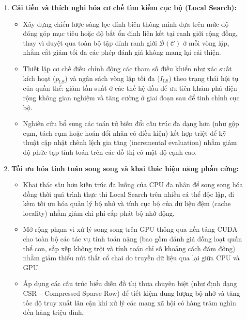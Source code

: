 \documentclass[14pt,a4paper]{extarticle}
\begin{document}
\begin{enumerate}
    \item \textbf{Cải tiến và thích nghi hóa cơ chế tìm kiếm cục bộ (Local Search):}
    \begin{itemize}
        \item Xây dựng chiến lược sàng lọc đỉnh biên thông minh dựa trên mức độ đóng góp mục tiêu hoặc độ bất ổn định liên kết tại ranh giới cộng đồng, thay vì duyệt qua toàn bộ tập đỉnh ranh giới $\mathcal{B}(\mathcal{C})$ ở mỗi vòng lặp, nhằm cắt giảm tối đa các phép đánh giá không mang lại cải thiện.
        \item Thiết lập cơ chế điều chỉnh động các tham số điều khiển như xác suất kích hoạt ($p_{\text{LS}}$) và ngân sách vòng lặp tối đa ($I_{\text{LS}}$) theo trạng thái hội tụ của quần thể: giảm tần suất ở các thế hệ đầu để ưu tiên khám phá diện rộng không gian nghiệm và tăng cường ở giai đoạn sau để tinh chỉnh cục bộ.
        \item Nghiên cứu bổ sung các toán tử biến đổi cấu trúc đa dạng hơn (như gộp cụm, tách cụm hoặc hoán đổi nhãn có điều kiện) kết hợp triệt để kỹ thuật cập nhật chênh lệch gia tăng (incremental evaluation) nhằm giảm độ phức tạp tính toán trên các đồ thị có mật độ cạnh cao.
    \end{itemize}

    \item \textbf{Tối ưu hóa tính toán song song và khai thác hiệu năng phần cứng:}
    \begin{itemize}
        \item Khai thác sâu hơn kiến trúc đa luồng của $\text{CPU}$ đa nhân để song song hóa đồng thời quá trình thực thi Local Search trên nhiều cá thể độc lập, đi kèm tối ưu hóa quản lý bộ nhớ và tính cục bộ của dữ liệu đệm (cache locality) nhằm giảm chi phí cấp phát bộ nhớ động.
        \item Mở rộng phạm vi xử lý song song trên $\text{GPU}$ thông qua nền tảng CUDA cho toàn bộ các tác vụ tính toán nặng (bao gồm đánh giá đồng loạt quần thể con, sắp xếp không trội và tính toán chỉ số khoảng cách đám đông) nhằm giảm thiểu nút thắt cổ chai do truyền dữ liệu qua lại giữa CPU và GPU.
        \item Áp dụng các cấu trúc biểu diễn đồ thị thưa chuyên biệt (như định dạng CSR -- Compressed Sparse Row) để tiết kiệm dung lượng bộ nhớ và tăng tốc độ truy xuất lân cận khi xử lý các mạng xã hội có hàng trăm nghìn đến hàng triệu đỉnh.
    \end{itemize}


\end{enumerate}
\end{document}
